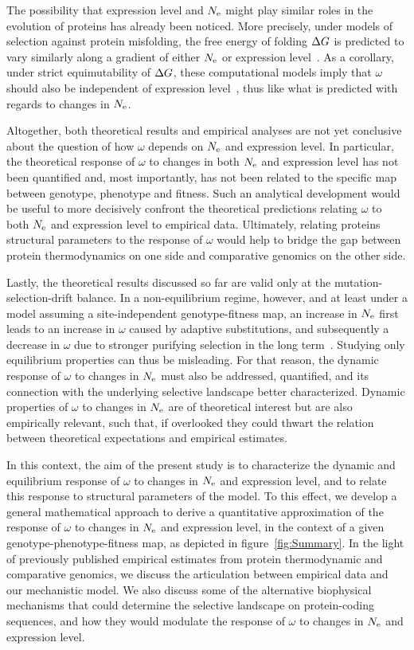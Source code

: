 The possibility that expression level and $N_{\text{e}}$ might play similar roles in the evolution of proteins has already been noticed.
More precisely, under models of selection against protein misfolding, the free energy of folding $\Delta G$ is predicted to vary similarly along a gradient of either $N_{\text{e}}$ or expression level~\citep{Serohijos2013}.
As a corollary, under strict equimutability of $\Delta G$, these computational models imply that $\omega$ should also be independent of expression level~\citep{Serohijos2012}, thus like what is predicted with regards to changes in $N_{\text{e}}$.

Altogether, both theoretical results and empirical analyses are not yet conclusive about the question of how $\omega$ depends on $N_{\text{e}}$ and expression level.
In particular, the theoretical response of $\omega$ to changes in both $N_{\text{e}}$ and expression level has not been quantified and, most importantly, has not been related to the specific map between genotype, \gls{phenotype} and fitness.
Such an analytical development would be useful to more decisively confront the theoretical predictions relating $\omega$ to both $N_{\text{e}}$ and expression level to empirical data.
Ultimately, relating proteins structural parameters to the response of $\omega$ would help to bridge the gap between protein thermodynamics on one side and comparative genomics on the other side.

Lastly, the theoretical results discussed so far are valid only at the mutation-selection-drift balance.
In a non-equilibrium regime, however, and at least under a model assuming a site-independent genotype-fitness map, an increase in $N_{\text{e}}$ first leads to an increase in $\omega$ caused by adaptive \glspl{substitution}, and subsequently a decrease in $\omega$ due to stronger purifying selection in the long term~\citep{Jones2016}.
Studying only equilibrium properties can thus be misleading.
For that reason, the dynamic response of $\omega$ to changes in $N_{\text{e}}$ must also be addressed, quantified, and its connection with the underlying selective landscape better characterized.
Dynamic properties of $\omega$ to changes in $N_{\text{e}}$ are of theoretical interest but are also empirically relevant, such that, if overlooked they could thwart the relation between theoretical expectations and empirical estimates.

In this context, the aim of the present study is to characterize the dynamic and equilibrium response of $\omega$ to changes in $N_{\text{e}}$ and expression level, and to relate this response to structural parameters of the model.
To this effect, we develop a general mathematical approach to derive a quantitative approximation of the response of $\omega$ to changes in $N_{\text{e}}$ and expression level, in the context of a given genotype-phenotype-fitness map, as depicted in figure~\ref{fig:Summary}.
In the light of previously published empirical estimates from protein thermodynamic and comparative genomics, we discuss the articulation between empirical data and our mechanistic model.
We also discuss some of the alternative biophysical mechanisms that could determine the selective landscape on protein-coding sequences, and how they would modulate the response of $\omega$ to changes in $N_{\text{e}}$ and expression level.


